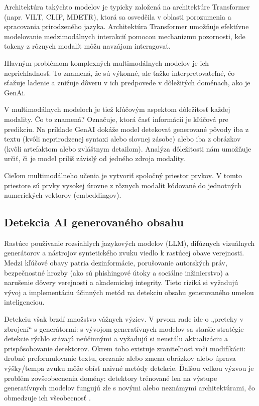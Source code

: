 \documentclass[]{tukediphc}
\begin{document}
Architektúra takýchto modelov je typicky založená na architektúre Transformer (napr. VILT, CLIP, MDETR), ktorá sa osvedčila v oblasti porozumenia a spracovania prirodzeného jazyka. Architektúra Transformer umožňuje efektívne modelovanie medzimodálnych interakcií pomocou mechanizmu pozornosti, kde tokeny z rôznych modalít môžu navzájom interagovať\cite{arxiv:clip}.

Hlavným problémom komplexných multimodálnych modelov je ich nepriehľadnosť. To znamená, že sú výkonné, ale ťažko interpretovateľné, čo sťažuje ladenie a znižuje dôveru v ich predpovede v dôležitých doménach, ako je GenAi.

V multimodálnych modeloch je tiež kľúčovým aspektom dôležitosť každej modality. Čo to znamená? Označuje, ktorá časť informácií je kľúčová pre predikciu. Na príklade GenAI dokáže model detekovať generované pôvody iba z textu (kvôli neprirodzenej syntaxi alebo slovnej zásobe) alebo iba z obrázkov (kvôli artefaktom alebo zvláštnym detailom). Analýza dôležitosti nám umožňuje určiť, či je model príliš závislý od jedného zdroja modality.

Cieľom multimodálneho učenia je vytvoriť spoločný priestor prvkov. V tomto priestore sú prvky vysokej úrovne z rôznych modalít kódované do jednotných numerických vektorov (embeddingov)\cite{arxiv:clip}.

\subsection{Detekcia AI generovaného obsahu}
Rastúce používanie rozsiahlych jazykových modelov (LLM), difúznych vizuálnych generátorov a nástrojov syntetického zvuku viedlo k rastúcej obave verejnosti. Medzi kľúčové obavy patria dezinformácie, porušovanie autorských práv, bezpečnostné hrozby (ako sú phishingové útoky a sociálne inžinierstvo) a narušenie dôvery verejnosti a akademickej integrity. Tieto riziká si vyžadujú vývoj a implementáciu účinných metód na detekciu obsahu generovaného umelou inteligenciou. 

Detekciu však brzdí množstvo vážnych výziev. V prvom rade ide o „preteky v zbrojení“ s generátormi: s vývojom generatívnych modelov sa staršie stratégie detekcie rýchlo stávajú neúčinnými a vyžadujú si neustálu aktualizáciu a prispôsobovanie detektorov. Okrem toho existuje zraniteľnosť voči modifikácii: drobné preformulovanie textu, orezanie alebo zmena obrázkov alebo úprava výšky/tempa zvuku môže obísť naivné metódy detekcie. Ďalšou veľkou výzvou je problém zovšeobecnenia domény: detektory trénované len na výstupe generatívnych modelov fungujú zle s novými alebo neznámymi architektúrami, čo obmedzuje ich všeobecnosť\cite{arxiv:2504.02898} .
\end{document}
